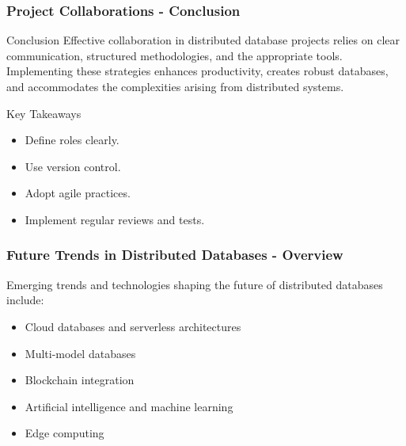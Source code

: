 \documentclass[aspectratio=169]{beamer}
\begin{document}
\begin{frame}[fragile]
    \frametitle{Project Collaborations - Conclusion}
    \begin{block}{Conclusion}
        Effective collaboration in distributed database projects relies on clear communication, structured methodologies, and the appropriate tools. 
        Implementing these strategies enhances productivity, creates robust databases, and accommodates the complexities arising from distributed systems.
    \end{block}
    
    \begin{block}{Key Takeaways}
        \begin{itemize}
            \item Define roles clearly.
            \item Use version control.
            \item Adopt agile practices.
            \item Implement regular reviews and tests.
        \end{itemize}
    \end{block}
\end{frame}

\begin{frame}[fragile]
  \frametitle{Future Trends in Distributed Databases - Overview}
  Emerging trends and technologies shaping the future of distributed databases include:
  \begin{itemize}
      \item Cloud databases and serverless architectures
      \item Multi-model databases
      \item Blockchain integration
      \item Artificial intelligence and machine learning
      \item Edge computing
  \end{itemize}
\end{frame}
\end{document}
